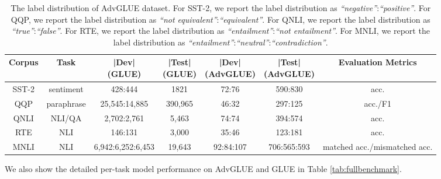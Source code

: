 \documentclass{article}
\newcommand{\method}{AdvGLUE\xspace}
\begin{document}
\begin{table}[t]
\small
    \centering
    \caption{\small The label distribution of \method dataset. For SST-2, we report the label distribution as \textit{``negative''}:\textit{``positive''}. For QQP, we report the label distribution as \textit{``not equivalent''}:\textit{``equivalent''}. For QNLI, we report the label distribution as \textit{``true''}:\textit{``false''}. For RTE, we report the label distribution as \textit{``entailment''}:\textit{``not entailment''}. For MNLI, we report the label distribution as \textit{``entailment''}:\textit{``neutral''}:\textit{``contradiction''}.
}
    \label{tab:labeldist}
\resizebox{1.0\textwidth}{!}
{
    \begin{tabular}{ccccccc}
    \toprule
        \textbf{Corpus} & \textbf{Task} & \shortstack{\textbf{|Dev|} \\ \scriptsize{(GLUE)}} & \shortstack{\textbf{|Test|} \\  \scriptsize{(GLUE)}} & \shortstack{\textbf{|Dev|} \\ \scriptsize{(AdvGLUE)}} & \shortstack{\textbf{|Test|} \\  \scriptsize{(AdvGLUE)}} &  \textbf{Evaluation Metrics}   \\   
        \midrule
        SST-2 & sentiment & 428:444 & 1821 & 72:76 & 590:830 & acc. \\
        QQP  & paraphrase & 25,545:14,885 & 390,965 & 46:32 & 297:125 & acc./F1 \\
        QNLI & NLI/QA & 2,702:2,761 & 5,463 & 74:74 & 394:574 & acc. \\
        RTE  & NLI & 146:131 & 3,000 & 35:46 & 123:181 & acc. \\
        MNLI & NLI & 6,942:6,252:6,453 & 19,643 & 92:84:107 & 706:565:593 & matched acc./mismatched acc. \\
        \bottomrule
        \end{tabular}
    }
\end{table}


We also show the detailed per-task model performance on \method and GLUE in Table \ref{tab:fullbenchmark}.
\end{document}
